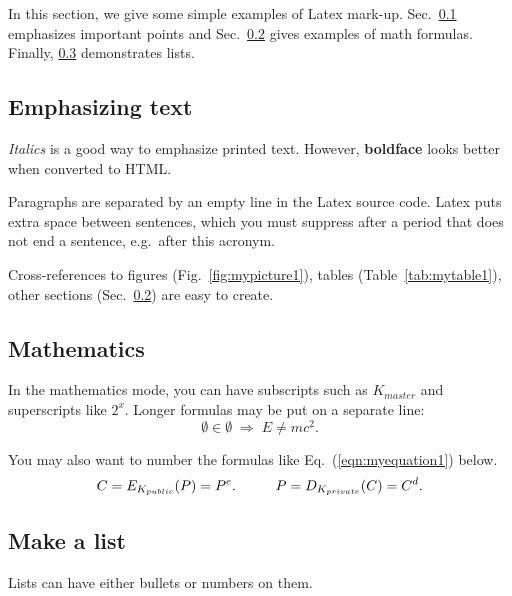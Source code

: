 \documentclass[article]{aaltoseries}
\begin{document}
In this section, we give some simple examples of Latex mark-up.
Sec.~\ref{sec:emphasis} emphasizes important points and
Sec.~\ref{sec:math} gives examples of math formulas.
Finally, \ref{sec:list} demonstrates lists.




\subsection{Emphasizing text}
\label{sec:emphasis}

\textit{Italics} is a good way to emphasize printed text. However,
\textbf{boldface} looks better when converted to HTML.

Paragraphs are separated by an empty line in the Latex source code.
Latex puts extra space between sentences, which you must suppress
after a period that does not end a sentence, e.g.\ after this acronym.

Cross-references to figures (Fig.~\ref{fig:mypicture1}), tables
(Table~\ref{tab:mytable1}), other sections (Sec.~\ref{sec:math})
are easy to create. 




\subsection{Mathematics}
\label{sec:math}

In the mathematics mode, you can have subscripts such as $K_{master}$
and superscripts like $2^x$. Longer formulas may be put on a separate
line:
\[ \emptyset \in \emptyset \; \Rightarrow \; E \neq mc^2. \]

You may also want to number the formulas like Eq.~(\ref{eqn:myequation1})
below.
\begin{equation}\label{eqn:myequation1}
C = E_{K_{public}}(P) = P^e. \hspace{10mm}   P = D_{K_{private}}(C) = C^d.
\end{equation}





\subsection{Make a list}
\label{sec:list}

Lists can have either bullets or numbers on them. 
\end{document}
